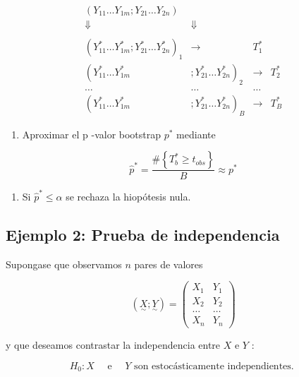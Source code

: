 \documentclass[
]{article}
\providecommand{\tightlist}{%
  \setlength{\itemsep}{0pt}\setlength{\parskip}{0pt}}
\begin{document}
\[
\begin{array}{cccc}
\left(Y_{11} \ldots Y_{1 m} ; Y_{21} \ldots Y_{2 n}\right) & & \\
\Downarrow & \Downarrow & & \\
& & & \\
\left(Y_{11}^{*} \ldots Y_{1 m}^{*} ; Y_{21}^{*} \ldots Y_{2 n}^{*}\right)_{1} & \rightarrow & T_{1}^{*} \\
\left(Y_{11}^{*} \ldots Y_{1 m}^{*}\right. & \left.; Y_{21}^{*} \ldots Y_{2 n}^{*}\right)_{2} & \rightarrow & T_{2}^{*} \\
\ldots & \ldots & \ldots & \\
\left(Y_{11}^{*} \ldots Y_{1 m}^{*}\right. & \left.; Y_{21}^{*} \ldots Y_{2 n}^{*}\right)_{B} & \rightarrow & T_{B}^{*}
\end{array}
\]

\begin{enumerate}
\def\labelenumi{\arabic{enumi}.}
\setcounter{enumi}{1}
\tightlist
\item
  Aproximar el p -valor bootstrap \(p^{*}\) mediante
\end{enumerate}

\[
\hat{p}^{*}=\frac{\#\left\{T_{b}^{*} \geq t_{o b s}\right\}}{B} \approx p^{*}
\]

\begin{enumerate}
\def\labelenumi{\arabic{enumi}.}
\setcounter{enumi}{2}
\tightlist
\item
  Si \(\hat{p}^{*} \leq \alpha\) se rechaza la hiopótesis nula.
\end{enumerate}

\subsection{Ejemplo 2: Prueba de independencia}\label{ejemplo-2-prueba-de-independencia}

Supongase que observamos \(n\) pares de valores

\[
(\underset{\sim}{X} ; \underset{\sim}{Y})=\left(\begin{array}{cc}
X_{1} & Y_{1} \\
X_{2} & Y_{2} \\
\ldots & \ldots \\
X_{n} & Y_{n}
\end{array}\right)
\]

y que deseamos contrastar la independencia entre \(X\) e \(Y\) :

\[
H_{0}: X \quad \text { e } \quad Y \text { son estocásticamente independientes. }
\]
\end{document}
